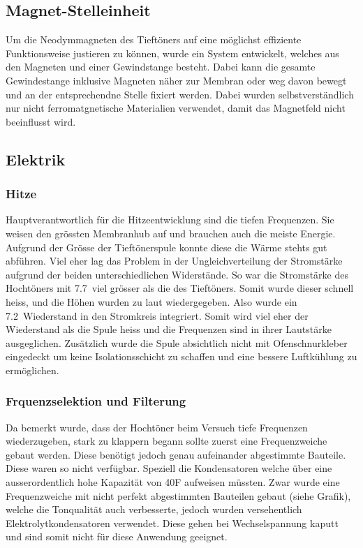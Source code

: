 \documentclass[a4paper,11pt]{report}
\begin{document}
\subsection{Magnet-Stelleinheit}
Um die Neodymmagneten des Tieftöners auf eine möglichst effiziente Funktionsweise justieren zu können, wurde ein System entwickelt, welches aus den Magneten und einer Gewindstange besteht. Dabei kann die gesamte Gewindestange inklusive Magneten näher zur Membran oder weg davon bewegt und an der entsprechendne Stelle fixiert werden. Dabei wurden selbstverständlich nur nicht ferromatgnetische Materialien verwendet, damit das Magnetfeld nicht beeinflusst wird.

\subsection{Elektrik}
\subsubsection*{Hitze}
Hauptverantwortlich für die Hitzeentwicklung sind die tiefen Frequenzen. Sie weisen den grössten Membranhub auf und brauchen auch die meiste Energie. Aufgrund der Grösse der Tieftönerspule konnte diese die Wärme stehts gut abführen. Viel eher lag das Problem in der Ungleichverteilung der Stromstärke aufgrund der beiden unterschiedlichen Widerstände. So war die Stromstärke des Hochtöners mit 7.7\Omega\ viel grösser als die des Tieftöners. Somit wurde dieser schnell heiss, und die Höhen wurden zu laut wiedergegeben. Also wurde ein 7.2\Omega\ Wiederstand in den Stromkreis integriert. Somit wird viel eher der Wiederstand als die Spule heiss und die Frequenzen sind in ihrer Lautstärke ausgeglichen. Zusätzlich wurde die Spule absichtlich nicht mit Ofenschnurkleber eingedeckt um keine Isolationsschicht zu schaffen und eine bessere Luftkühlung zu ermöglichen.
\subsubsection*{Frquenzselektion und Filterung}
Da bemerkt wurde, dass der Hochtöner beim Versuch tiefe Frequenzen wiederzugeben, stark zu klappern begann sollte zuerst eine Frequenzweiche gebaut werden. Diese benötigt jedoch genau aufeinander abgestimmte Bauteile. Diese waren so nicht verfügbar. Speziell die Kondensatoren welche über eine ausserordentlich hohe Kapazität von 40\mu F aufweisen müssten. Zwar wurde eine Frequenzweiche mit nicht perfekt abgestimmten Bauteilen gebaut (siehe Grafik), welche die Tonqualität auch verbesserte, jedoch wurden versehentlich Elektrolytkondensatoren verwendet. Diese gehen bei Wechselspannung kaputt und sind somit nicht für diese Anwendung geeignet. 
\end{document}
